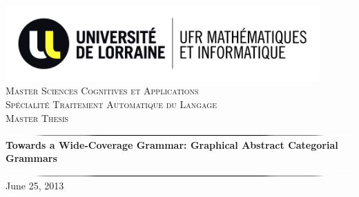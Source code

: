 \documentclass{report}
\begin{document}
\begin{titlepage}
\begin{center}

\newcommand{\HRule}{\includegraphics[width=\textwidth]{images/hrule.png}}

\includegraphics[width=0.9\textwidth]{images/UL_UFR_MI.jpg}\\[2cm]

\textsc{\LARGE Master Sciences Cognitives et Applications\\Sp\'ecialit\'e Traitement Automatique du Langage}\\[1.5cm]

\textsc{\Large Master Thesis}\\[0.65cm]

\HRule \\[0.6cm]
{ \huge \bfseries Towards a Wide-Coverage Grammar: Graphical Abstract Categorial Grammars }\\[0.4cm]

\HRule \\[0.75cm]

June 25, 2013 \\[0.5cm]


\end{center}
\end{titlepage}
\end{document}
